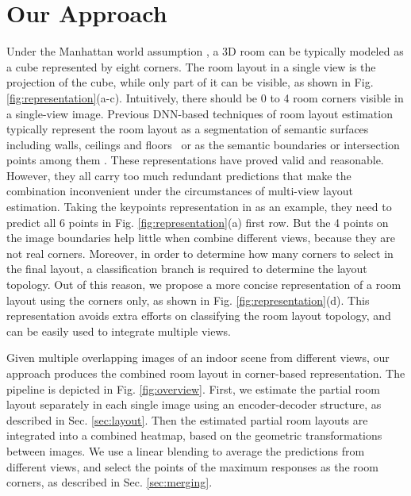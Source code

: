 \section{Our Approach}


Under the Manhattan world assumption \cite{coughlan1999manhattan}, a 3D room can be typically modeled as a cube represented by eight corners.
The room layout in a single view is the projection of the cube, while only part of it can be visible, as shown in Fig. \ref{fig:representation}(a-c). 
Intuitively, there should be 0 to 4 room corners visible in a single-view image. 
%
Previous DNN-based techniques of room layout estimation typically represent the room layout as a segmentation of semantic surfaces including walls, ceilings and floors~\cite{dasgupta2016delay} or as the semantic boundaries or intersection points among them \cite{ren2016coarse,zhao2017physics,LeeRoomNet17}. 
%
These representations have proved valid and reasonable. 
However, they all carry too much redundant predictions that make the combination inconvenient under the circumstances of multi-view layout estimation. Taking the keypoints representation in \cite{LeeRoomNet17} as an example, they need to predict all 6 points in Fig. \ref{fig:representation}(a) first row. But the 4 points on the image boundaries help little when combine different views, because they are not real corners. 
Moreover, in order to determine how many corners to select in the final layout, a classification branch is required to determine the layout topology. 
Out of this reason, we propose a more concise representation of a room layout using the corners only, as shown in Fig. \ref{fig:representation}(d). 
This representation avoids extra efforts on classifying the room layout topology, and can be easily used to integrate multiple views.
%


%

Given multiple overlapping images of an indoor scene from different views, our approach produces the combined room layout in corner-based representation. The pipeline is depicted in Fig. \ref{fig:overview}. 
%
First, we estimate the partial room layout separately in each single image using an encoder-decoder structure, as described in Sec. \ref{sec:layout}. 
Then the estimated partial room layouts are integrated into a combined heatmap, based on the geometric transformations between images. 
We use a linear blending to average the predictions from different views, and select the points of the maximum responses as the room corners, as described in Sec. \ref{sec:merging}. 

